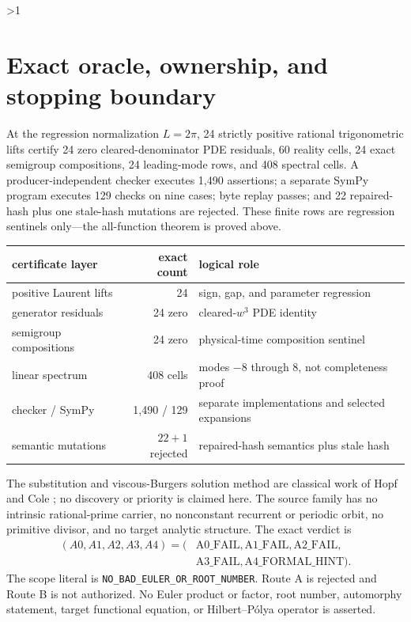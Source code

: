 \documentclass[8pt]{extarticle}
\begin{document}
\ifnum\CRevisionRound>1
\newpage
\section{Exact oracle, ownership, and stopping boundary}

At the regression normalization \(L=2\pi\), 24 strictly positive rational
trigonometric lifts certify 24 zero cleared-denominator PDE residuals, 60 reality
cells, 24 exact semigroup compositions, 24 leading-mode rows, and 408 spectral
cells. A producer-independent checker executes 1,490 assertions; a separate SymPy
program executes 129 checks on nine cases; byte replay passes; and 22 repaired-hash
plus one stale-hash mutations are rejected. These finite rows are regression
sentinels only---the all-function theorem is proved above.

\begin{center}
\begin{tabularx}{0.94\textwidth}{@{}l r X@{}}
\toprule
certificate layer & exact count & logical role\\
\midrule
positive Laurent lifts & 24 & sign, gap, and parameter regression\\
generator residuals & 24 zero & cleared-\(w^3\) PDE identity\\
semigroup compositions & 24 zero & physical-time composition sentinel\\
linear spectrum & 408 cells & modes \(-8\) through \(8\), not completeness proof\\
checker / SymPy & 1,490 / 129 & separate implementations and selected expansions\\
semantic mutations & \(22+1\) rejected & repaired-hash semantics plus stale hash\\
\bottomrule
\end{tabularx}
\end{center}

The substitution and viscous-Burgers solution method are classical work of Hopf
\cite{hopf1950} and Cole \cite{cole1951}; no discovery or priority is claimed here.
The source family has no intrinsic rational-prime carrier, no nonconstant recurrent
or periodic orbit, no primitive divisor, and no target analytic structure. The exact
verdict is
\[
\begin{aligned}
(A0,A1,A2,A3,A4)=(&\mathrm{A0\_FAIL},\mathrm{A1\_FAIL},
\mathrm{A2\_FAIL},\\
&\mathrm{A3\_FAIL},\mathrm{A4\_FORMAL\_HINT}).
\end{aligned}
\]
The scope literal is \texttt{NO\_BAD\_EULER\_OR\_ROOT\_NUMBER}.
Route A is rejected and Route B is not authorized. No Euler product or factor,
root number, automorphy statement, target functional equation, or Hilbert--Pólya
operator is asserted.
\end{document}
